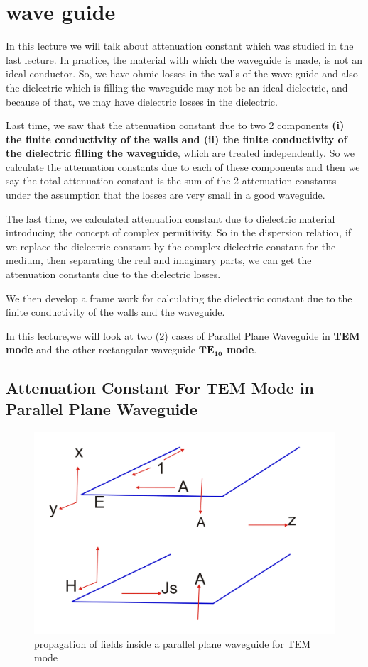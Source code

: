 \chapter{wave guide}
In this lecture we will talk about attenuation constant which was studied in the last lecture. In practice, the material with which the waveguide is made, is not an ideal conductor. So, we have ohmic losses in the walls  of the wave guide and also the dielectric which is filling the waveguide may not be an ideal dielectric, and because of that, we may have dielectric losses in the dielectric.


Last time, we saw that the attenuation constant due to two {2} components \textbf{(i) the finite conductivity of the walls and (ii) the finite conductivity of the dielectric filling the waveguide}, which are treated independently. So we calculate the attenuation constants due to each of these components and then we say the total attenuation constant is the sum of the 2 attenuation constants under the assumption that the losses are very small in a good waveguide.

The last time, we calculated attenuation constant due to dielectric material introducing the concept of complex permitivity. So in the dispersion relation, if we replace the dielectric constant by the complex dielectric constant for the medium, then separating the real and imaginary parts, we can get the attenuation constants due to the dielectric losses.

We then develop a frame work for calculating the dielectric constant due to the finite conductivity of the walls and the waveguide.

In this lecture,we will look at two (2) cases of Parallel Plane Waveguide in \textbf{TEM mode} and the other rectangular waveguide \textbf{$\boldsymbol{TE_{10}}$ mode}.

\section{Attenuation Constant For TEM Mode in Parallel Plane Waveguide}

\begin{figure}[h]
\centering
\includegraphics[scale=0.45]{./graphics/lecture2-image-b.png}
\caption{propagation of fields inside a parallel plane waveguide for TEM mode}
\end{figure}

